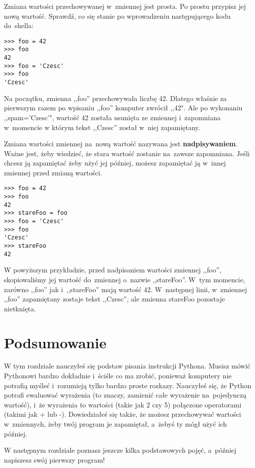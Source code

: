 \documentclass{book}
\begin{document}
Zmiana wartości przechowywanej w~zmiennej jest prosta. Po prostu przypisz jej nową wartość. Sprawdź, co się stanie po wprowadzeniu następującego kodu do~shella:

\begin{lstlisting}
>>> foo = 42
>>> foo
42
>>> foo = 'Czesc'
>>> foo
'Czesc'
\end{lstlisting}

Na początku, zmienna ,,foo'' przechowywała liczbę 42. Dlatego właśnie za pierwszym razem po wpisaniu ,,foo'' komputer zwrócił ,,42". Ale po wykonaniu ,,spam='Czesc'", wartość 42 została usunięta ze zmiennej i~zapomniana w~momencie w którym tekst ,,Czesc'' został w~niej zapamiętany.

Zmiana wartości zmiennej na~nową wartość nazywana jest {\bf nadpisywaniem}. Ważne jest, żeby wiedzieć, że stara wartość zostanie na~zawsze zapomniana. Jeśli chcesz ją zapamiętać żeby użyć jej później, możesz zapamiętać ją w~innej zmiennej przed zmianą wartości.

\begin{lstlisting}
>>> foo = 42
>>> foo
42
>>> stareFoo = foo
>>> foo = 'Czesc'
>>> foo
'Czesc'
>>> stareFoo
42
\end{lstlisting}

W powyższym przykładzie, przed nadpisaniem wartości zmiennej ,,foo'', skopiowaliśmy jej wartość do~zmiennej o~nazwie ,,stareFoo''. W~tym momencie, zarówno ,,foo'' jak i~,,stareFoo'' mają wartość 42. W~następnej linii, w~zmiennej ,,foo'' zapamiętany zostaje tekst ,,Czesc'', ale zmienna stareFoo pozostaje nietknięta.

\section{Podsumowanie}

W tym rozdziale nauczyłeś się podstaw pisania instrukcji Pythona. Musisz mówić Pythonowi bardzo dokładnie i~ściśle co ma zrobić, ponieważ komputery nie potrafią myśleć i~rozumieją tylko bardzo proste rozkazy. Nauczyłeś się, że Python potrafi ewaluować wyrażenia (to znaczy, zamienić całe wyrażenie na~pojedynczą wartość), i~że wyrażenia to wartości (takie jak 2 czy 5) połączone operatorami (takimi jak + lub -). Dowiedziałeś się także, że możesz przechowywać wartości w~zmiennych, żeby twój program je zapamiętał, a~żebyś ty mógł użyć ich później.

W następnym rozdziale poznasz jeszcze kilka podstawowych pojęć, a~później napiszesz swój pierwszy program!
\end{document}

